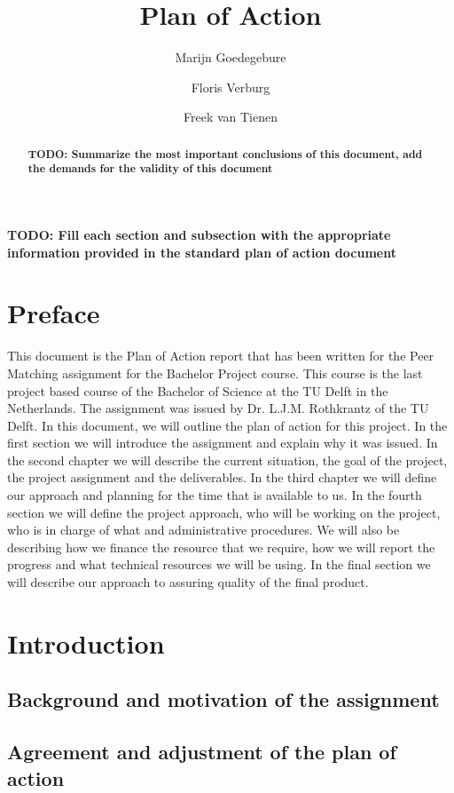 \documentclass[]{article}
\title{Plan of Action}
\author{Marijn Goedegebure \and
	Floris Verburg \and
	Freek van Tienen}
\date{}
\newcommand{\TODO}[1]{{\color{red}\textbf{TODO: #1}}}
\begin{document}
\maketitle

\begin{abstract}
\TODO{Summarize the most important conclusions of this document, add the demands for the validity of this document}
\end{abstract}

\newpage

\tableofcontents

\newpage
\TODO{Fill each section and subsection with the appropriate information provided in the standard plan of action document}
\section{Preface}
This document is the Plan of Action report that has been written for the Peer Matching assignment for the Bachelor Project course.
This course is the last project based course of the Bachelor of Science at the TU Delft in the Netherlands.
The assignment was issued by Dr. L.J.M. Rothkrantz of the TU Delft.
In this document, we will outline the plan of action for this project.
In the first section we will introduce the assignment and explain why it was issued.
In the second chapter we will describe the current situation, the goal of the project, the project assignment and the deliverables.
In the third chapter we will define our approach and planning for the time that is available to us.
In the fourth section we will define the project approach, who will be working on the project, who is in charge of what and administrative procedures.
We will also be describing how we finance the  resource that we require, how we will report the progress and what technical resources we will be using.
In the final section we will describe our approach to assuring quality of the final product.
\section{Introduction}
\subsection{Background and motivation of the assignment}
\subsection{Agreement and adjustment of the plan of action}
\end{document}
